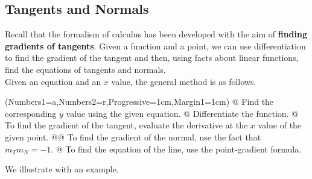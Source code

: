 \documentclass[a4paper,11pt]{article}
\begin{document}
	\subsection{Tangents and Normals}
	Recall that the formalism of calculus has been developed with the aim of \textbf{finding gradients of tangents}. Given a function and a point, we can use differentiation to find the gradient of the tangent and then, using facts about linear functions, find the equations of tangents and normals.\\
	
	\noindent Given an equation and an $x$ value, the general method is as follows.
	\vspace{0.15cm}
	\begin{easylist}[enumerate]
	\ListProperties(Numbers1=a,Numbers2=r,Progressive=1cm,Margin1=1cm)
	@ Find the corresponding $y$ value using the given equation.
	@ Differentiate the function.
	@ To find the gradient of the tangent, evaluate the derivative at the $x$ value of the given point. 
	@@ To find the gradient of the normal, use the fact that $m_Tm_N=-1$.
	@ To find the equation of the line, use the point-gradient formula.
	\end{easylist}
\vspace{0.15cm}
	\noindent We illustrate with an example.
	
\end{document}
